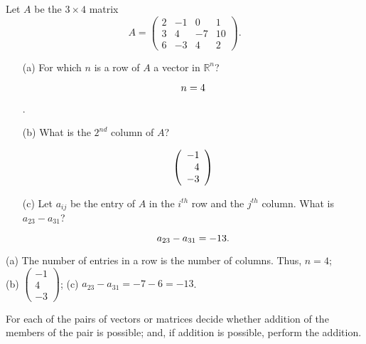 \documentclass{ximera}
\def\R{\mathbb R}
\begin{document}
\begin{exercise} \label{c1.1.2}
Let $A$ be the $3\times 4$ matrix
\[
A=\left(\begin{array}{rrrr} 2 & -1 & 0 & 1 \\ 3 & 4 & -7 & 10\\
        6 & -3 & 4 & 2 \end{array}\right).
\]
\begin{enumerate}
\item[(a)]  For which $n$ is a row of $A$ a vector in $\R^n$? \begin{prompt}\[n = 4\]\end{prompt}.
\item[(b)]  What is the $2^{nd}$ column of $A$?
  \begin{prompt}
    \[
      \left(\begin{array}{r} -1 \\ 4 \\ -3 \end{array} \right)
    \]
  \end{prompt}
\item[(c)] Let $a_{ij}$ be the entry of $A$ in the $i^{th}$ row
  and the $j^{th}$ column.  What is $a_{23}-a_{31}$?
  \begin{prompt}
    \[
      a_{23}-a_{31} = -13.
    \]
  \end{prompt}
\end{enumerate}

\begin{solution}

(a) The number of entries in a row is the number of columns.  Thus, $n = 4$; \\
(b) $\left(\begin{array}{r} -1 \\ 4 \\ -3 \end{array} \right)$;
(c) $a_{23}-a_{31} =  -7 - 6 = -13$.

\end{solution}
\end{exercise}





\problemlabel

\noindent For each of the pairs of vectors or matrices decide whether addition of the members of the pair is possible; and, if addition is possible, perform the addition.
\end{document}
